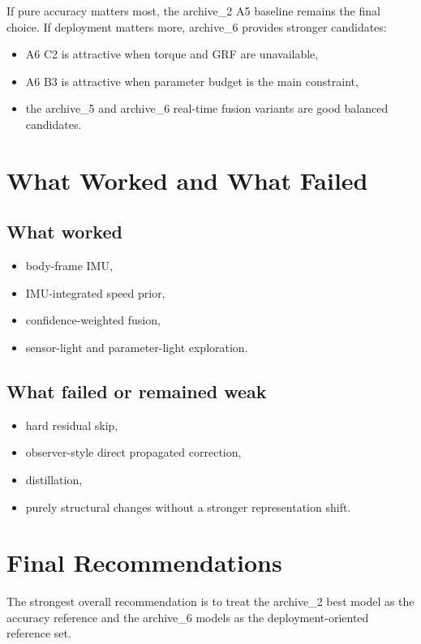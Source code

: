 \documentclass[11pt,a4paper]{article}
\begin{document}
If pure accuracy matters most, the archive\_2 A5 baseline remains the final choice. If deployment matters more, archive\_6 provides stronger candidates:

\begin{itemize}
\item A6 C2 is attractive when torque and GRF are unavailable,
\item A6 B3 is attractive when parameter budget is the main constraint,
\item the archive\_5 and archive\_6 real-time fusion variants are good balanced candidates.
\end{itemize}

\section{What Worked and What Failed}

\subsection{What worked}

\begin{itemize}
\item body-frame IMU,
\item IMU-integrated speed prior,
\item confidence-weighted fusion,
\item sensor-light and parameter-light exploration.
\end{itemize}

\subsection{What failed or remained weak}

\begin{itemize}
\item hard residual skip,
\item observer-style direct propagated correction,
\item distillation,
\item purely structural changes without a stronger representation shift.
\end{itemize}

\section{Final Recommendations}

The strongest overall recommendation is to treat the archive\_2 best model as the accuracy reference and the archive\_6 models as the deployment-oriented reference set.
\end{document}
